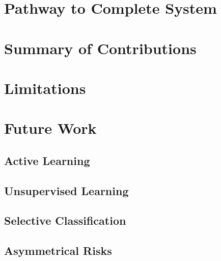 \section{Pathway to Complete System}



\section{Summary of Contributions}



\section{Limitations}



\section{Future Work}

\subsection{Active Learning}

\subsection{Unsupervised Learning}

\subsection{Selective Classification}

\subsection{Asymmetrical Risks}
